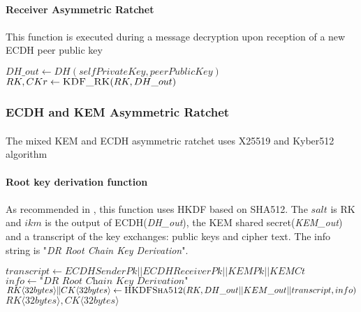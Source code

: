 \documentclass[a4paper,11pt]{article}
\begin{document}
      \paragraph*{Receiver Asymmetric Ratchet}
      \paragraph*{}This function is executed during a message decryption upon reception of a new ECDH peer public key
      \begin{algorithmic}
          \Statex
          \State $DH\_out \gets DH(selfPrivateKey, peerPublicKey)$
          \State $RK, CKr \gets \Call{KDF\_RK}{RK, DH\_out}$
        \EndFunction
      \end{algorithmic}

    \subsubsection{ECDH and KEM Asymmetric Ratchet}
      \paragraph{}The mixed KEM and ECDH asymmetric ratchet uses X25519 and Kyber512 algorithm
      \paragraph*{Root key derivation function}
      \paragraph{}As recommended in \cite[section 5.2]{doubleRatchet}, this function uses HKDF\cite{rfc5869} based on SHA512. The $salt$ is RK and $ikm$ is the output of ECDH(\textit{DH\_out}), the KEM shared secret(\textit{KEM\_out}) and a transcript of the key exchanges: public keys and cipher text. The info string is "\textit{DR Root Chain Key Derivation}".

      \begin{algorithmic}
        \State $transcript \gets ECDH Sender Pk || ECDH Receiver Pk || KEM Pk || KEM Ct$
          \State $info \gets \textit{"DR Root Chain Key Derivation"}$
          \State $RK\langle 32bytes\rangle\Arrowvert CK\langle 32bytes\rangle \gets \Call{HKDFSha512}{RK, DH\_out || KEM\_out || transcript, info}$
          \State \Return $RK\langle 32bytes\rangle , CK\langle 32bytes\rangle$
        \EndFunction
      \end{algorithmic}
\end{document}
